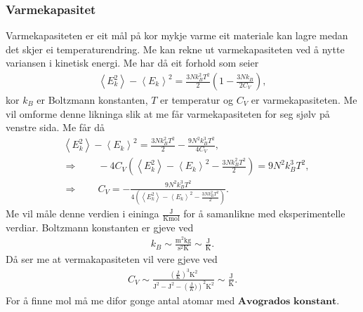 \documentclass[12pt, a4paper]{article}
\theoremstyle{definition} \newtheorem*{definition}{Teorem}
\newcommand{\lla}{\left \langle}
\newcommand{\rra}{\right \rangle}
\begin{document}
        \subsubsection*{Varmekapasitet}
            Varmekapasiteten er eit mål på kor mykje varme eit materiale kan lagre medan det skjer ei temperaturendring. Me kan rekne ut varmekapasiteten ved å nytte variansen 
            i kinetisk energi. Me har då eit forhold som seier
            \begin{align*}
                \lla E_k^2 \rra - \lla E_k \rra^2 = \frac{3Nk_B^2T^2}{2}\left( 1 - \frac{3Nk_B}{2C_V} \right),
            \end{align*}
            kor $k_B$ er Boltzmann konstanten, $T$ er temperatur og $C_V$ er varmekapasiteten. Me vil omforme denne likninga slik at me får varmekapasiteten for seg sjølv på 
            venstre sida. Me får då
            \begin{align*}
                &\lla E_k^2 \rra - \lla E_k \rra^2 = \frac{3Nk_B^2T^2}{2} - \frac{9N^2k_B^3T^2}{4C_V}, \\
                &\Rightarrow \qquad -4C_V\left( \lla E_k^2 \rra - \lla E_k \rra^2 -\frac{3Nk_B^2T^2}{2}\right) = 9N^2k_B^3T^2, \\
                &\Rightarrow \qquad C_V = -\frac{9N^2k_B^3T^2}{4\left( \lla E_k^2 \rra - \lla E_k \rra^2 -\frac{3Nk_B^2T^2}{2}\right)}.
            \end{align*}
            Me vil måle denne verdien i eininga $\frac{\text{J}}{\text{Kmol}}$ for å samanlikne med eksperimentelle verdiar. Boltzmann konstanten er gjeve ved
            \begin{align*}
                k_B \sim \frac{\text{m}^2\text{kg}}{\text{s}^2\text{K}} \sim \frac{\text{J}}{\text{K}}.
            \end{align*}
            Då ser me at vermakapasiteten vil vere gjeve ved
            \begin{align*}
                C_V \sim \frac{\left( \frac{\text{J}}{\text{K}} \right)^3\text{K}^2}{\text{J}^2 - \text{J}^2 - \left(\frac{\text{J}}{K})\right)^2\text{K}^2} 
                \sim \frac{\text{J}}{\text{K}}.
            \end{align*}
            For å finne mol må me difor gonge antal atomar med $\textbf{Avogrados konstant}$.
\end{document}
